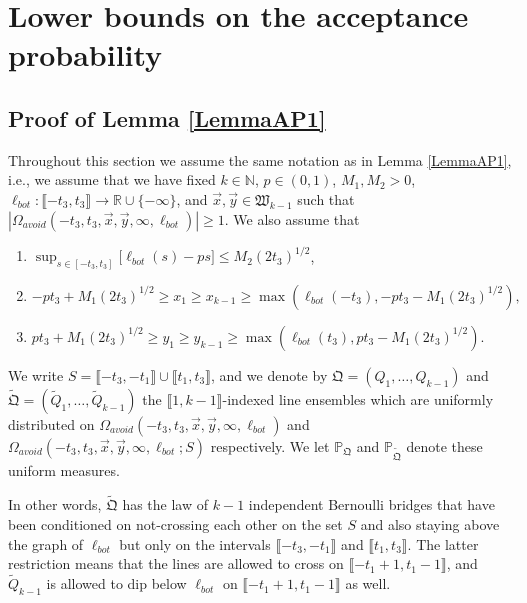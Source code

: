 %
\section{Lower bounds on the acceptance probability}\label{Section6}

\subsection{Proof of Lemma \ref{LemmaAP1}}\label{sect61} Throughout this section we assume the same notation as in Lemma \ref{LemmaAP1}, i.e., we assume that we have fixed $k \in \mathbb{N}$, $p \in (0,1)$, $M_1, M_2 > 0$, $\ell_{bot}: \llbracket -t_3, t_3 \rrbracket \rightarrow \mathbb{R} \cup \{ - \infty \}$, and $\vec{x}, \vec{y} \in \mathfrak{W}_{k-1}$ such that $|\Omega_{avoid}(-t_3, t_3, \vec{x}, \vec{y}, \infty, \ell_{bot})| \geq 1$. We also assume that
\begin{enumerate}
	\item $\sup_{s \in [- t_3,t_3]}\big[\ell_{bot}(s)  - ps \big]  \leq M_2 (2t_3)^{1/2}$,
	\item  $-pt_3 + M_1 (2t_3)^{1/2} \geq  x_1 \geq  x_{k-1} \geq \max\left(\ell_{bot}(-t_3), -pt_3 - M_1 (2t_3)^{1/2}\right),$
	\item $pt_3 + M_1 (2t_3)^{1/2} \geq y_1 \geq y_{k-1} \geq  \max \left( \ell_{bot}(t_3),  p t_3 - M_1(2t_3)^{1/2} \right).$
\end{enumerate}

\begin{definition}\label{TildeDef}
	We write $S = \llbracket -t_3,-t_1\rrbracket\cup \llbracket t_1,t_3\rrbracket$, and we denote by $\mathfrak{Q} = (Q_1,\dots,Q_{k-1})$ and $\tilde{\mathfrak{Q}} = (\tilde{Q}_1, \dots, \tilde{Q}_{k-1})$ the $\llbracket 1, k-1 \rrbracket$-indexed line ensembles which are uniformly distributed on $\Omega_{avoid}(-t_3,t_3,\vec{x},\vec{y},\infty, \ell_{bot})$ and $\Omega_{avoid}(-t_3, t_3, \vec{x}, \vec{y}, \infty, \ell_{bot};S)$ respectively. We let $\mathbb{P}_{\mathfrak{Q}}$ and $\mathbb{P}_{\tilde{\mathfrak{Q}}}$ denote these uniform measures.
\end{definition}
In other words, $\tilde{\mathfrak{Q}}$ has the law of $k-1$ independent Bernoulli bridges that have been conditioned on not-crossing each other on the set $S$ and also staying above the graph of $\ell_{bot}$ but only on the intervals $\llbracket-t_3, -t_1\rrbracket$ and $\llbracket t_1, t_3\rrbracket$. The latter restriction means that the lines are allowed to cross on $\llbracket -t_1+1,t_1-1\rrbracket$, and  $\tilde{Q}_{k-1}$ is allowed to dip below $\ell_{bot}$ on $\llbracket -t_1+1,t_1-1\rrbracket$ as well.

